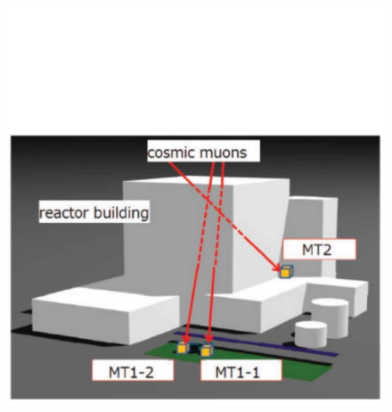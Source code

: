 \begin{figure}[!h]
\centering
\begin{minipage}{.45\textwidth}
  \centering
  \includegraphics[width=\linewidth]{Chapter5/Figs/MuTomographyExamples/JapcNuclearPowerImaging.jpg}
  \label{fig:JapcNuclearPowerImaging}
  \vspace{0.956cm} %
\end{minipage}%
\qquad
\begin{minipage}{.45\textwidth}
  \centering

\end{minipage}
\end{figure}
